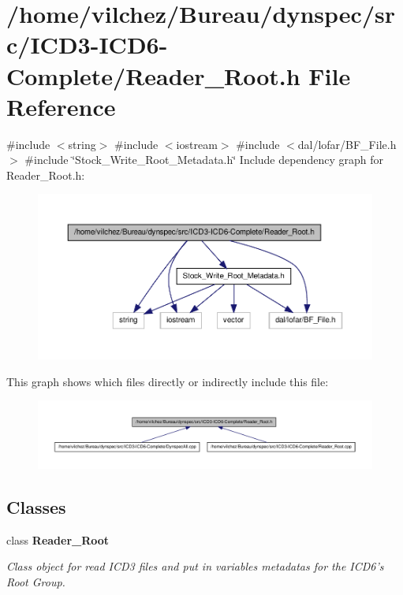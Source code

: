 \section{/home/vilchez/\-Bureau/dynspec/src/\-I\-C\-D3-\/\-I\-C\-D6-\/\-Complete/\-Reader\-\_\-\-Root.h \-File \-Reference}
\label{_reader___root_8h}
{\ttfamily \#include $<$string$>$}\*
{\ttfamily \#include $<$iostream$>$}\*
{\ttfamily \#include $<$dal/lofar/\-B\-F\-\_\-\-File.\-h$>$}\*
{\ttfamily \#include \char`\"{}\-Stock\-\_\-\-Write\-\_\-\-Root\-\_\-\-Metadata.\-h\char`\"{}}\*
\-Include dependency graph for \-Reader\-\_\-\-Root.\-h\-:\nopagebreak
\begin{figure}[H]
\begin{center}
\leavevmode
\includegraphics[width=350pt]{_reader___root_8h__incl}
\end{center}
\end{figure}
\-This graph shows which files directly or indirectly include this file\-:\nopagebreak
\begin{figure}[H]
\begin{center}
\leavevmode
\includegraphics[width=350pt]{_reader___root_8h__dep__incl}
\end{center}
\end{figure}
\subsection*{\-Classes}
\begin{DoxyCompactItemize}
\item 
class {\bf \-Reader\-\_\-\-Root}
\begin{DoxyCompactList}\small\item\em \-Class object for read \-I\-C\-D3 files and put in variables metadatas for the \-I\-C\-D6's \-Root \-Group. \end{DoxyCompactList}\end{DoxyCompactItemize}
